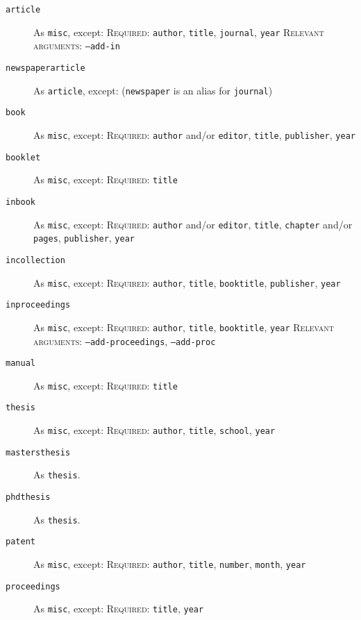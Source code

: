 \documentclass{article}
\begin{document}
\begin{description}
\item[\texttt{article}] As \texttt{misc}, except:
\textsc{Required:} \texttt{author}, \texttt{title}, \texttt{journal},
\texttt{year}
\textsc{Relevant arguments:} \texttt{--add-in}

\item[\texttt{newspaperarticle}] As \texttt{article}, except:
(\texttt{newspaper} is an alias for \texttt{journal})

\item[\texttt{book}] As \texttt{misc}, except:
\textsc{Required:} \texttt{author} and/or \texttt{editor}, \texttt{title},
\texttt{publisher}, \texttt{year}

\item[\texttt{booklet}] As \texttt{misc}, except:
\textsc{Required:} \texttt{title}

\item[\texttt{inbook}] As \texttt{misc}, except:
\textsc{Required:} \texttt{author} and/or \texttt{editor}, \texttt{title},
\texttt{chapter} and/or \texttt{pages}, \texttt{publisher}, \texttt{year}

\item[\texttt{incollection}] As \texttt{misc}, except:
\textsc{Required:} \texttt{author}, \texttt{title}, \texttt{booktitle},
\texttt{publisher}, \texttt{year}

\item[\texttt{inproceedings}] As \texttt{misc}, except:
\textsc{Required:} \texttt{author}, \texttt{title}, \texttt{booktitle},
\texttt{year}
\textsc{Relevant arguments:} \texttt{--add-proceedings}, \texttt{--add-proc}

\item[\texttt{manual}] As \texttt{misc}, except:
\textsc{Required:} \texttt{title}

\item[\texttt{thesis}] As \texttt{misc}, except:
\textsc{Required:} \texttt{author}, \texttt{title}, \texttt{school},
\texttt{year}

\item[\texttt{mastersthesis}] As \texttt{thesis}.

\item[\texttt{phdthesis}] As \texttt{thesis}.

\item[\texttt{patent}] As \texttt{misc}, except:
\textsc{Required:} \texttt{author}, \texttt{title}, \texttt{number},
\texttt{month}, \texttt{year}

\item[\texttt{proceedings}] As \texttt{misc}, except:
\textsc{Required:} \texttt{title}, \texttt{year}


\end{description}
\end{document}
